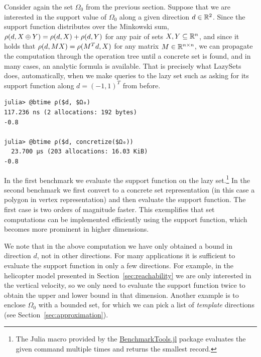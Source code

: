 Consider again the set $\Omega_0$ from the previous section. Suppose that we are interested in the support value of $\Omega_0$ along a given direction $d \in \mathbb{R}^2$.
%
Since the support function distributes over the Minkowski sum, $\rho(d, X \oplus Y) = \rho(d, X) + \rho(d, Y)$ for any pair of sets $X, Y \subseteq \mathbb{R}^n$, and since it holds that $\rho(d, M X) = \rho(M^T d, X)$ for any matrix $M \in \mathbb{R}^{n \times n}$, we can propagate the computation through the operation tree until a concrete set is found, and in many cases, an analytic formula is available.
%
That is precisely what LazySets does, automatically, when we make queries to the lazy set such as asking for its support function along $d = (-1, 1)^T$ from before.

\begin{minipage}{\linewidth}
	\vspace{-\abovedisplayskip}
	\begin{lstlisting}
julia> @btime ρ($d, $Ω₀)
117.236 ns (2 allocations: 192 bytes)
-0.8

julia> @btime ρ($d, concretize($Ω₀))
  23.700 μs (203 allocations: 16.03 KiB)
-0.8
	\end{lstlisting}
\end{minipage}

In the first benchmark we evaluate the support function on the lazy set.\footnote{The Julia macro  provided by the \href{https://github.com/JuliaCI/BenchmarkTools.jl}{BenchmarkTools.jl} package evaluates the given command multiple times and returns the smallest record.}
In the second benchmark we first convert to a concrete set representation (in this case a polygon in vertex representation) and then evaluate the support function.
The first case is two orders of magnitude faster.
This exemplifies that set computations can be implemented efficiently using the support function, which becomes more prominent in higher dimensions.

We note that in the above computation we have only obtained a bound in direction $d$, not in other directions. For many applications it is sufficient to evaluate the support function in only a few directions. For example, in the helicopter model presented in Section~\ref{sec:reachability} we are only interested in the vertical velocity, so we only need to evaluate the support function twice to obtain the upper and lower bound in that dimension.
Another example is to enclose $\Omega_0$ with a bounded set, for which we can pick a list of \emph{template} directions (see Section~\ref{sec:approximation}).

